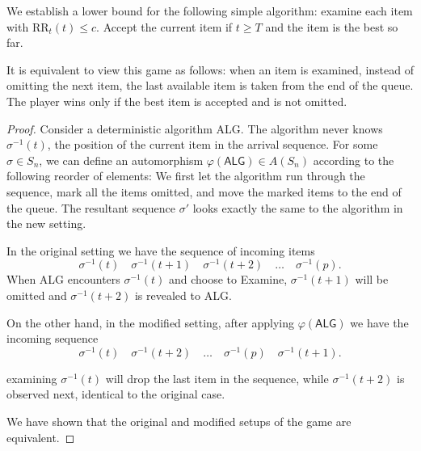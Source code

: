 We establish a lower bound for the following simple algorithm: examine each item with $\text{RR}_t(t) \le  c $. Accept the current item if $t \ge  T $ and the item is the best so far.

\begin{algorithm}[H]
\caption{Simple algorithm}
\label{alg:simple} 
\begin{algorithmic}[1]
\Else
{}
\EndIf
{} 
\Else
{}
\EndIf
\EndWhile
{}
\end{algorithmic}
\end{algorithm}

\begin{lemma}
	\label{lem:equiv-construct-pasp}
It is equivalent to view this game as follows: when an item is examined, instead of omitting the next item, the last available item is taken from the end of the queue. The player wins only if the best item is accepted and is not omitted.
\end{lemma}
\begin{proof}
	Consider a deterministic algorithm \textsf{ALG}. The algorithm never knows $\sigma^{-1}(t)$, the position of the current item in the arrival sequence. For some $\sigma \in S_n$, we can define an automorphism $\varphi(\mathsf{ALG}) \in A(S_n)$ according to the following reorder of elements: We first let the algorithm run through the sequence, mark all the items omitted, and move the marked items to the end of the queue. The resultant sequence $\sigma'$ looks exactly the same to the algorithm in the new setting.

	In the original setting we have the sequence of incoming items 
\[
	\sigma^{-1} (t) \quad \sigma^{-1} (t+1) \quad \sigma^{-1} (t+2) \quad \ldots \quad \sigma^{-1} (p)
.\] 
	When \textsf{ALG} encounters $\sigma^{-1}(t)$ and choose to \textsf{Examine}, $ \sigma^{-1}(t+1)$ will be omitted and $\sigma^{-1} (t+2)$ is revealed to \textsf{ALG}. 

	On the other hand, in the modified setting, after applying $\varphi(\mathsf{ALG})$ we have the incoming sequence 
\[
	\sigma^{-1} (t)  \quad \sigma^{-1} (t+2) \quad \ldots \quad \sigma^{-1} (p) \quad \sigma^{-1} (t+1)
.\]

	examining $\sigma^{-1} (t)$ will drop the last item in the sequence, while $\sigma^{-1} (t+2)$ is observed next, identical to the original case.
	
	We have shown that the original and modified setups of the game are equivalent.
\end{proof}

